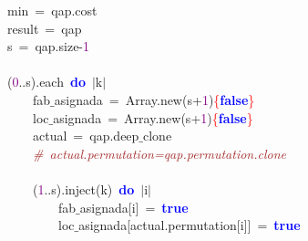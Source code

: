 \mbox{}\ \ \ \ \ \ \ \ \ \ \ \ min\ \textcolor{BrickRed}{=}\ qap\textcolor{BrickRed}{.}cost \\
\mbox{}\ \ \ \ \ \ \ \ \ \ \ \ result\ \textcolor{BrickRed}{=}\ qap \\
\mbox{}\ \ \ \ \ \ \ \ \ \ \ \ s\ \textcolor{BrickRed}{=}\ qap\textcolor{BrickRed}{.}size\textcolor{BrickRed}{-}\textcolor{Purple}{1} \\
\mbox{} \\
\mbox{}\ \ \ \ \ \ \ \ \ \ \ \ \textcolor{BrickRed}{(}\textcolor{Purple}{0}\textcolor{BrickRed}{..}s\textcolor{BrickRed}{).}each\ \textbf{\textcolor{Blue}{do}}\ \textcolor{BrickRed}{$|$}k\textcolor{BrickRed}{$|$} \\
\mbox{}\ \ \ \ \ \ \ \ \ \ \ \ \ \ \ \ fab$\_$asignada\ \textcolor{BrickRed}{=}\ Array\textcolor{BrickRed}{.}new\textcolor{BrickRed}{(}s\textcolor{BrickRed}{+}\textcolor{Purple}{1}\textcolor{BrickRed}{)}\textcolor{Red}{\{}\textbf{\textcolor{Blue}{false}}\textcolor{Red}{\}} \\
\mbox{}\ \ \ \ \ \ \ \ \ \ \ \ \ \ \ \ loc$\_$asignada\ \textcolor{BrickRed}{=}\ Array\textcolor{BrickRed}{.}new\textcolor{BrickRed}{(}s\textcolor{BrickRed}{+}\textcolor{Purple}{1}\textcolor{BrickRed}{)}\textcolor{Red}{\{}\textbf{\textcolor{Blue}{false}}\textcolor{Red}{\}} \\
\mbox{}\ \ \ \ \ \ \ \ \ \ \ \ \ \ \ \ actual\ \textcolor{BrickRed}{=}\ qap\textcolor{BrickRed}{.}deep$\_$clone \\
\mbox{}\ \ \ \ \ \ \ \ \ \ \ \ \ \ \ \ \textit{\textcolor{Brown}{\#\ actual.permutation=qap.permutation.clone}} \\
\mbox{}\ \ \ \ \ \ \ \ \ \ \ \ \ \ \ \  \\
\mbox{}\ \ \ \ \ \ \ \ \ \ \ \ \ \ \ \ \textcolor{BrickRed}{(}\textcolor{Purple}{1}\textcolor{BrickRed}{..}s\textcolor{BrickRed}{).}inject\textcolor{BrickRed}{(}k\textcolor{BrickRed}{)}\ \textbf{\textcolor{Blue}{do}}\ \textcolor{BrickRed}{$|$}i\textcolor{BrickRed}{$|$} \\
\mbox{}\ \ \ \ \ \ \ \ \ \ \ \ \ \ \ \ \ \ \ \ fab$\_$asignada\textcolor{BrickRed}{[}i\textcolor{BrickRed}{]}\ \textcolor{BrickRed}{=}\ \textbf{\textcolor{Blue}{true}} \\
\mbox{}\ \ \ \ \ \ \ \ \ \ \ \ \ \ \ \ \ \ \ \ loc$\_$asignada\textcolor{BrickRed}{[}actual\textcolor{BrickRed}{.}permutation\textcolor{BrickRed}{[}i\textcolor{BrickRed}{]]}\ \textcolor{BrickRed}{=}\ \textbf{\textcolor{Blue}{true}} \\
\mbox{}\ \ \ \ \ \ \ \ \ \ \ \ \ \ \ \ \ \ \ \  \\
